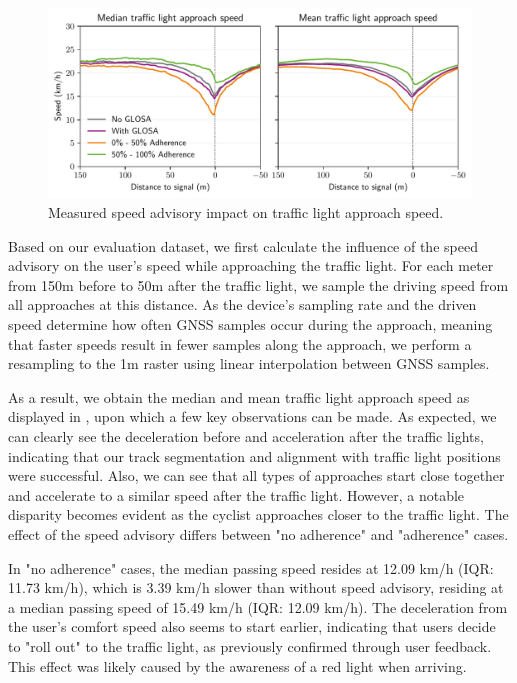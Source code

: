 \begin{figure}[t]
\caption{Measured speed advisory impact on traffic light approach speed.}\label{fig:impacts-approach-speed}
\includegraphics[width=\linewidth]{images/impacts-approach-speed.pdf}
\end{figure}

Based on our evaluation dataset, we first calculate the influence of the speed advisory on the user's speed while approaching the traffic light. For each meter from 150m before to 50m after the traffic light, we sample the driving speed from all approaches at this distance. As the device's sampling rate and the driven speed determine how often GNSS samples occur during the approach, meaning that faster speeds result in fewer samples along the approach, we perform a resampling to the 1m raster using linear interpolation between GNSS samples.

As a result, we obtain the median and mean traffic light approach speed as displayed in , upon which a few key observations can be made. As expected, we can clearly see the deceleration before and acceleration after the traffic lights, indicating that our track segmentation and alignment with traffic light positions were successful. Also, we can see that all types of approaches start close together and accelerate to a similar speed after the traffic light. However, a notable disparity becomes evident as the cyclist approaches closer to the traffic light. The effect of the speed advisory differs between "no adherence" and "adherence" cases.

In "no adherence" cases, the median passing speed resides at 12.09 km/h (IQR: 11.73 km/h), which is 3.39 km/h slower than without speed advisory, residing at a median passing speed of 15.49 km/h (IQR: 12.09 km/h). The deceleration from the user's comfort speed also seems to start earlier, indicating that users decide to "roll out" to the traffic light, as previously confirmed through user feedback. This effect was likely caused by the awareness of a red light when arriving.

